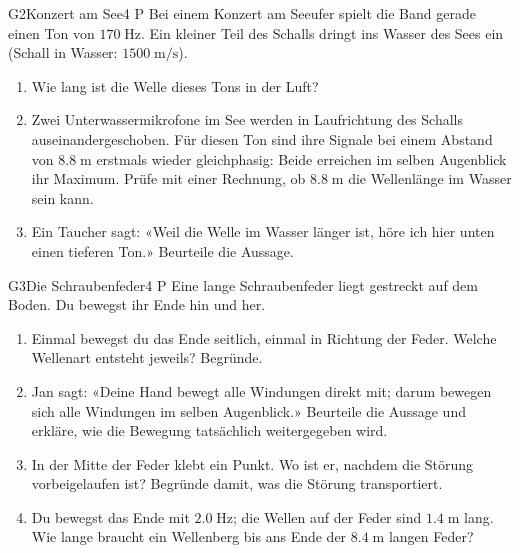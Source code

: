 \documentclass[11pt]{article}
\begin{document}
\begin{lpaufgabe}{G2}{Konzert am See}{4 P}
Bei einem Konzert am Seeufer spielt die Band gerade einen Ton von \(170\;\text{Hz}\). Ein kleiner Teil des Schalls dringt ins Wasser des Sees ein (Schall in Wasser: \(1500\;\text{m/s}\)).
\begin{enumerate}[label=\alph*),leftmargin=*,itemsep=2pt,topsep=2pt]
\item Wie lang ist die Welle dieses Tons in der Luft?
\item Zwei Unterwassermikrofone im See werden in Laufrichtung des Schalls auseinandergeschoben. Für diesen Ton sind ihre Signale bei einem Abstand von \(8.8\;\text{m}\) erstmals wieder gleichphasig: Beide erreichen im selben Augenblick ihr Maximum. Prüfe mit einer Rechnung, ob \(8.8\;\text{m}\) die Wellenlänge im Wasser sein kann.
\item Ein Taucher sagt: «Weil die Welle im Wasser länger ist, höre ich hier unten einen tieferen Ton.» Beurteile die Aussage.
\end{enumerate}
\end{lpaufgabe}

\begin{lpaufgabe}{G3}{Die Schraubenfeder}{4 P}
Eine lange Schraubenfeder liegt gestreckt auf dem Boden. Du bewegst ihr Ende hin und her.
\begin{enumerate}[label=\alph*),leftmargin=*,itemsep=2pt,topsep=2pt]
\item Einmal bewegst du das Ende seitlich, einmal in Richtung der Feder. Welche Wellenart entsteht jeweils? Begründe.
\item Jan sagt: «Deine Hand bewegt alle Windungen direkt mit; darum bewegen sich alle Windungen im selben Augenblick.» Beurteile die Aussage und erkläre, wie die Bewegung tatsächlich weitergegeben wird.
\item In der Mitte der Feder klebt ein Punkt. Wo ist er, nachdem die Störung vorbeigelaufen ist? Begründe damit, was die Störung transportiert.
\item Du bewegst das Ende mit \(2.0\;\text{Hz}\); die Wellen auf der Feder sind \(1.4\;\text{m}\) lang. Wie lange braucht ein Wellenberg bis ans Ende der \(8.4\;\text{m}\) langen Feder?
\end{enumerate}
\end{lpaufgabe}

\end{document}
